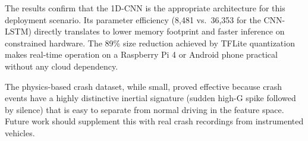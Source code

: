 The results confirm that the 1D-CNN is the appropriate architecture for this deployment scenario. Its parameter efficiency (8,481 vs.\ 36,353 for the CNN-LSTM) directly translates to lower memory footprint and faster inference on constrained hardware. The 89\% size reduction achieved by TFLite quantization makes real-time operation on a Raspberry Pi 4 or Android phone practical without any cloud dependency.

The physics-based crash dataset, while small, proved effective because crash events have a highly distinctive inertial signature (sudden high-G spike followed by silence) that is easy to separate from normal driving in the feature space. Future work should supplement this with real crash recordings from instrumented vehicles.
